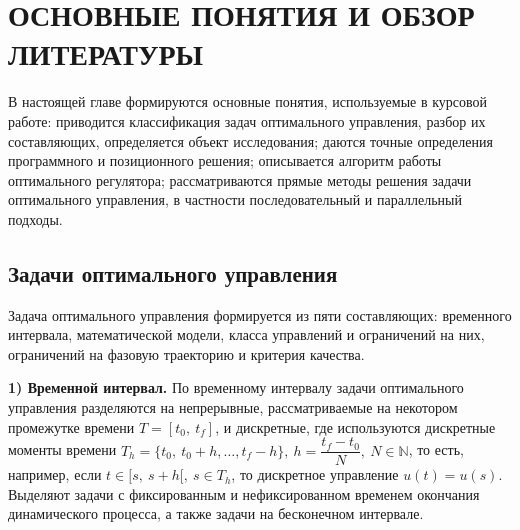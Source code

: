 \chapter{ОСНОВНЫЕ ПОНЯТИЯ И ОБЗОР ЛИТЕРАТУРЫ }\label{chap1}

\bigskip
В настоящей главе формируются основные понятия, используемые в курсовой работе: приводится классификация задач оптимального управления, разбор их составляющих, определяется объект исследования; даются точные определения программного и позиционного решения; описывается алгоритм работы оптимального  регулятора; рассматриваются прямые методы решения задачи оптимального управления, в частности последовательный и параллельный подходы.
\bigskip
%

\section{Задачи оптимального управления}\label{1_1}
Задача оптимального управления формируется из пяти составляющих: временного интервала, математической модели, класса управлений и ограничений на них, ограничений на фазовую траекторию и критерия качества.


\textbf{1) Временной интервал.} По временному интервалу задачи оптимального управления разделяются на непрерывные, рассматриваемые на некотором промежутке времени $T = [t_0,~ t_f]$, и дискретные, где используются дискретные моменты времени $T_h = \{t_0,~ t_0 + h, \ldots , t_f - h \}, ~h = \dfrac{t_f-t_0}{N}, ~N \in \mathbb{N}$, то есть, например, если $t \in [s,~s+h[ ,~s \in T_h$, то дискретное управление $ u(t) = u(s) $.
Выделяют задачи с фиксированным и нефиксированном временем окончания динамического процесса, а также задачи на бесконечном интервале.


